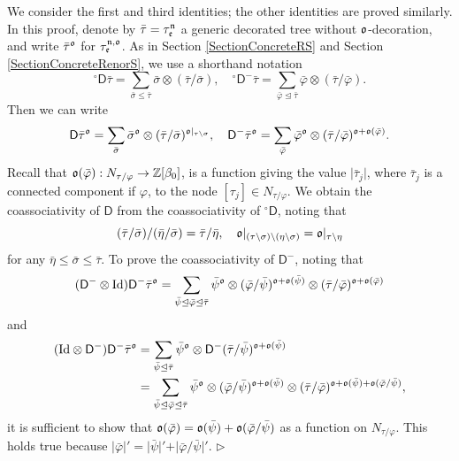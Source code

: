 \documentclass[10pt, reqno]{amsart}
\numberwithin{subsection}{section}
\numberwithin{subsubsection}{subsection}
\numberwithin{equation}{section} %
\newenvironment{Dem}[1][\unskip]{%
    \begin{list}{\hspace{1.15cm}{\sf \textbf{{\small Proof #1 --}}}}{%
        \setlength{\topsep}{0pt}%
        \setlength{\leftmargin}{0pt}%
        \setlength{\rightmargin}{0pt}%
        \setlength{\listparindent}{0pt}%
        \setlength{\itemindent}{0pt}%
        \setlength{\parsep}{0pt}%
        \addtolength{\leftmargin}{0pt}%
        \addtolength{\rightmargin}{0pt}%
    } \item }{\hfill $\rhd$\end{list}\smallskip}
\theoremstyle{mystyle}
\theoremstyle{mystyle2}
\theoremstyle{mystyle3}
\newcommand{\iden}{\text{\rm Id}}
\newcommand{\sfD}{\mathsf{D}}
\newcommand\bbZ{\mathbb{Z}}
\begin{document}
\begin{Dem}
We consider the first and third identities; the other identities are proved similarly. In this proof, denote by $\bar{\tau}=\tau_{\frak{e}}^{\frak{n}}$ a generic decorated tree without $\frak{o}$-decoration, and write $\bar\tau^{\frak{o}}$ for $\tau_{\frak{e}}^{\frak{n},\frak{o}}$. As in Section \ref{SectionConcreteRS} 
and Section \ref{SectionConcreteRenorS}, we use a shorthand notation
$$
{^\circ}{\sfD}\bar\tau = \sum_{\bar\sigma\le\bar\tau}\bar\sigma\otimes(\bar\tau/\bar\sigma),\quad
{^\circ}{\sfD}^-\bar\tau = \sum_{\bar\varphi\trianglelefteq\bar\tau}\bar\varphi\otimes(\bar\tau/\bar\varphi).
$$
Then we can write
$$
{\sfD}\bar\tau^{\frak{o}} = \sum_{\bar\sigma}\bar\sigma^{\frak{o}}\otimes(\bar\tau/\bar\sigma)^{\frak{o}\vert_{\tau\setminus\sigma}},\quad
{\sfD}^-\bar\tau^{\frak{o}} = \sum_{\bar\varphi}\bar\varphi^{\frak{o}}\otimes(\bar\tau/\bar\varphi)^{\frak{o}+\frak{o}(\bar\varphi)}.
$$
Recall that $\frak{o}(\bar\varphi):N_{\tau/\varphi}\to\bbZ[\beta_0]$, is a function giving the value $\vert\bar\tau_j\vert$, where $\bar\tau_j$ is 
a connected component if $\varphi$, to the node $[\tau_j]\in N_{\tau/\varphi}$. We obtain the coassociativity of $\sfD$ from the coassociativity of ${^\circ}\sfD$, noting that
$$
(\bar\tau/\bar\sigma)/(\bar\eta/\bar\sigma)=\bar\tau/\bar\eta,\quad
\frak{o}\vert_{(\tau\setminus\sigma)\setminus(\eta\setminus\sigma)}=\frak{o}\vert_{\tau\setminus\eta}
$$
for any $\bar\eta\le\bar\sigma\le\bar\tau$. To prove the coassociativity of $\sfD^-$, noting that
\begin{align*}
(\sfD^-\otimes\iden)\sfD^-\bar\tau^{\frak{o}}
= \sum_{\bar\psi\trianglelefteq\bar\varphi\trianglelefteq\bar\tau}
\bar\psi^{\frak{o}}\otimes(\bar\varphi/\bar\psi)^{\frak{o}+\frak{o}(\bar\psi)}
\otimes(\bar\tau/\bar\varphi)^{\frak{o}+\frak{o}(\bar\varphi)}
\end{align*}
and
\begin{align*}
(\iden\otimes\sfD^-)\sfD^-\bar\tau^{\frak{o}}
&= \sum_{\bar\psi\trianglelefteq\bar\tau} \bar\psi^{\frak{o}}\otimes\sfD^-(\bar\tau/\bar\psi)^{\frak{o}+\frak{o}(\bar\psi)}\\
&= \sum_{\bar\psi\trianglelefteq\bar\varphi\trianglelefteq\bar\tau} \bar\psi^{\frak{o}}\otimes(\bar\varphi/\bar\psi)^{\frak{o}+\frak{o}(\bar\psi)} \otimes (\bar\tau/\bar\varphi)^{\frak{o}+\frak{o}(\bar\psi)+\frak{o}(\bar\varphi/\bar\psi)},
\end{align*}
it is sufficient to show that $\frak{o}(\bar\varphi)=\frak{o}(\bar\psi)+\frak{o}(\bar\varphi/\bar\psi)$ as a function on $N_{\tau/\varphi}$. This holds true because $\vert\bar\varphi\vert' = \vert\bar\psi\vert' + \vert\bar\varphi/\bar\psi\vert'$.
\end{Dem}
\end{document}
